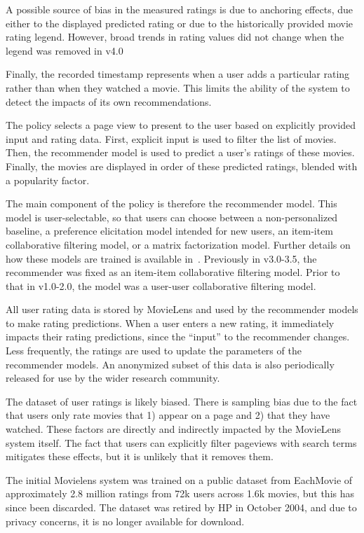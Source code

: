 \documentclass[12pt, a4paper, twocolumn]{article}
\begin{document}
{A possible source of bias in the measured ratings is due to anchoring effects, due either to the displayed predicted rating or due to the historically provided movie rating legend.
However, broad trends in rating values did not change when the legend was removed in v4.0

Finally, the recorded timestamp represents when a user adds a particular rating rather than when they watched a movie. 
This limits the ability of the system to detect the impacts of its own recommendations.

}{%
The policy selects a page view to present to the user based on explicitly provided input and rating data.
First, explicit input is used to filter the list of movies. 
Then, the recommender model is used to predict a user's ratings of these movies.
Finally, the movies are displayed in order of these predicted ratings, blended with a popularity factor.

The main component of the policy is therefore the recommender model. This model is user-selectable, so that users can choose between a non-personalized baseline, a preference elicitation model intended for new users, an item-item collaborative filtering model, or a matrix factorization model. Further details on how these models are trained is available in~\cite{ekstrand2015letting}.
Previously in v3.0-3.5, the recommender was fixed as an item-item collaborative filtering model.
Prior to that in v1.0-2.0, the model was a user-user collaborative filtering model.
}{%
All user rating data is stored by MovieLens and used by the recommender models to make rating predictions. 
When a user enters a new rating, it immediately impacts their rating predictions, since the ``input'' to the recommender changes. Less frequently, the ratings are used to update the parameters of the recommender models.
An anonymized subset of this data is also periodically released for use by the wider research community.


The dataset of user ratings is likely biased.
There is sampling bias due to the fact that users only rate movies that 1) appear on a page and 2) that they have watched. These factors are directly and indirectly  impacted by the MovieLens system itself.
The fact that users can explicitly filter pageviews with search terms mitigates these effects, but it is unlikely that it removes them.


The initial Movielens system was trained on a public dataset from EachMovie of approximately 2.8 million ratings from 72k users across 1.6k movies, but this has since been discarded. The dataset was retired by HP in October 2004, and due to privacy concerns, it is no longer available for download.

}
\end{document}
